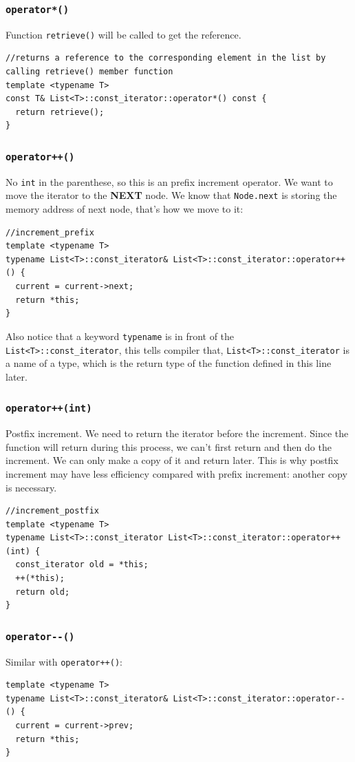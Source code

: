 \documentclass[12pt]{book}
\begin{document}
\subsubsection{\texttt{operator*()}}
\label{sec:orgb42b3e8}
Function \texttt{retrieve()} will be called to get the reference.
\begin{verbatim}
//returns a reference to the corresponding element in the list by calling retrieve() member function
template <typename T>
const T& List<T>::const_iterator::operator*() const {
  return retrieve();
}
\end{verbatim}
\subsubsection{\texttt{operator++()}}
\label{sec:org611c8d8}
No \texttt{int} in the parenthese, so this is an prefix increment operator. We want to move the iterator to the \textbf{NEXT} node. We know that \texttt{Node.next} is storing the memory address of next node, that's how we move to it:
\begin{verbatim}
//increment_prefix
template <typename T>
typename List<T>::const_iterator& List<T>::const_iterator::operator++() {
  current = current->next;
  return *this;
}
\end{verbatim}
Also notice that a keyword \texttt{typename} is in front of the \texttt{List<T>::const\_iterator}, this tells compiler that, \texttt{List<T>::const\_iterator} is a name of a type, which is the return type of the function defined in this line later.
\subsubsection{\texttt{operator++(int)}}
\label{sec:org177d7c9}
Postfix increment. We need to return the iterator before the increment. Since the function will return during this process, we can't first return and then do the increment. We can only make a copy of it and return later. This is why postfix increment may have less efficiency compared with prefix increment: another copy is necessary.
\begin{verbatim}
//increment_postfix
template <typename T>
typename List<T>::const_iterator List<T>::const_iterator::operator++(int) {
  const_iterator old = *this;
  ++(*this);
  return old;
}
\end{verbatim}
\subsubsection{\texttt{operator-{}-()}}
\label{sec:org6fa0838}
Similar with \texttt{operator++()}:
\begin{verbatim}
template <typename T>
typename List<T>::const_iterator& List<T>::const_iterator::operator--() {
  current = current->prev;
  return *this;
}
\end{verbatim}
\end{document}
